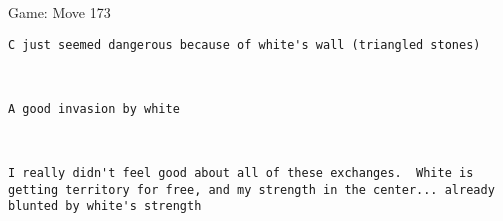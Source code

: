 \documentclass{article}
\begin{document}
\begin{section}{Game: Move 173}
\begin{center}
\begin{lstlisting}
C just seemed dangerous because of white's wall (triangled stones)\end{lstlisting}
\end{center}
\begin{center}
\cleargoban
{}
\showfullgoban
\\\begin{lstlisting}
A good invasion by white\end{lstlisting}
\end{center}
\begin{center}
\cleargoban
{}
\showfullgoban
\\\begin{lstlisting}
I really didn't feel good about all of these exchanges.  White is getting territory for free, and my strength in the center... already blunted by white's strength\end{lstlisting}
\end{center}
\end{section}
\newpage
\end{document}
